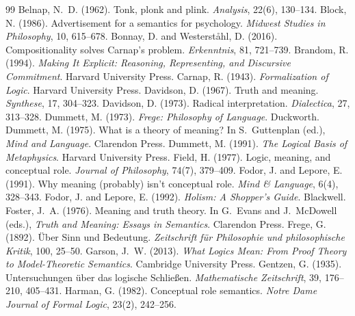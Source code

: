 \documentclass{situationist-preprint}
\begin{document}
\begin{thebibliography}{99}\small
{} Belnap, N.~D. (1962). Tonk, plonk and plink. \emph{Analysis}, 22(6), 130--134.
 Block, N. (1986). Advertisement for a semantics for psychology. \emph{Midwest Studies in Philosophy}, 10, 615--678.
 Bonnay, D. and Westerst{\aa}hl, D. (2016). Compositionality solves Carnap's problem. \emph{Erkenntnis}, 81, 721--739.
 Brandom, R. (1994). \emph{Making It Explicit: Reasoning, Representing, and Discursive Commitment}. Harvard University Press.
 Carnap, R. (1943). \emph{Formalization of Logic}. Harvard University Press.
 Davidson, D. (1967). Truth and meaning. \emph{Synthese}, 17, 304--323.
 Davidson, D. (1973). Radical interpretation. \emph{Dialectica}, 27, 313--328.
 Dummett, M. (1973). \emph{Frege: Philosophy of Language}. Duckworth.
 Dummett, M. (1975). What is a theory of meaning? In S.~Guttenplan (ed.), \emph{Mind and Language}. Clarendon Press.
 Dummett, M. (1991). \emph{The Logical Basis of Metaphysics}. Harvard University Press.
 Field, H. (1977). Logic, meaning, and conceptual role. \emph{Journal of Philosophy}, 74(7), 379--409.
 Fodor, J. and Lepore, E. (1991). Why meaning (probably) isn't conceptual role. \emph{Mind \& Language}, 6(4), 328--343.
 Fodor, J. and Lepore, E. (1992). \emph{Holism: A Shopper's Guide}. Blackwell.
 Foster, J.~A. (1976). Meaning and truth theory. In G.~Evans and J.~McDowell (eds.), \emph{Truth and Meaning: Essays in Semantics}. Clarendon Press.
 Frege, G. (1892). {\"U}ber Sinn und Bedeutung. \emph{Zeitschrift f{\"u}r Philosophie und philosophische Kritik}, 100, 25--50.
 Garson, J.~W. (2013). \emph{What Logics Mean: From Proof Theory to Model-Theoretic Semantics}. Cambridge University Press.
 Gentzen, G. (1935). Untersuchungen {\"u}ber das logische Schlie{\ss}en. \emph{Mathematische Zeitschrift}, 39, 176--210, 405--431.
 Harman, G. (1982). Conceptual role semantics. \emph{Notre Dame Journal of Formal Logic}, 23(2), 242--256.

\end{thebibliography}
\end{document}
